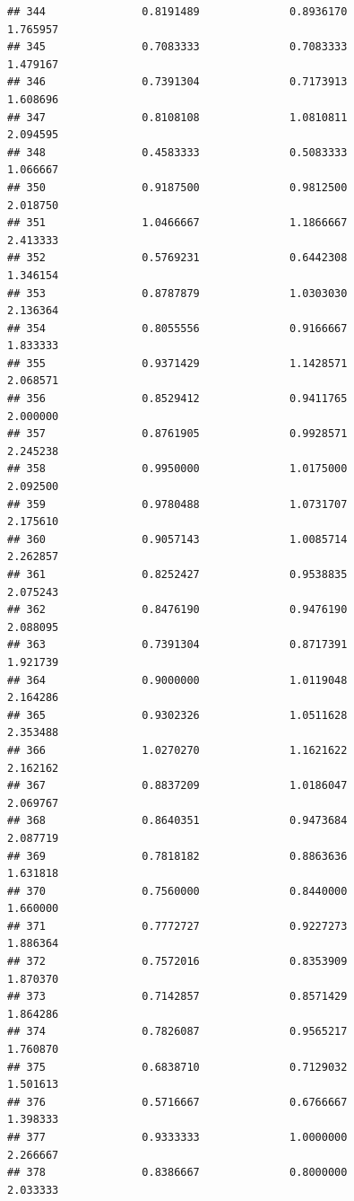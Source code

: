\documentclass[]{article}
\begin{document}
\begin{verbatim}
## 344               0.8191489              0.8936170               1.765957
## 345               0.7083333              0.7083333               1.479167
## 346               0.7391304              0.7173913               1.608696
## 347               0.8108108              1.0810811               2.094595
## 348               0.4583333              0.5083333               1.066667
## 350               0.9187500              0.9812500               2.018750
## 351               1.0466667              1.1866667               2.413333
## 352               0.5769231              0.6442308               1.346154
## 353               0.8787879              1.0303030               2.136364
## 354               0.8055556              0.9166667               1.833333
## 355               0.9371429              1.1428571               2.068571
## 356               0.8529412              0.9411765               2.000000
## 357               0.8761905              0.9928571               2.245238
## 358               0.9950000              1.0175000               2.092500
## 359               0.9780488              1.0731707               2.175610
## 360               0.9057143              1.0085714               2.262857
## 361               0.8252427              0.9538835               2.075243
## 362               0.8476190              0.9476190               2.088095
## 363               0.7391304              0.8717391               1.921739
## 364               0.9000000              1.0119048               2.164286
## 365               0.9302326              1.0511628               2.353488
## 366               1.0270270              1.1621622               2.162162
## 367               0.8837209              1.0186047               2.069767
## 368               0.8640351              0.9473684               2.087719
## 369               0.7818182              0.8863636               1.631818
## 370               0.7560000              0.8440000               1.660000
## 371               0.7772727              0.9227273               1.886364
## 372               0.7572016              0.8353909               1.870370
## 373               0.7142857              0.8571429               1.864286
## 374               0.7826087              0.9565217               1.760870
## 375               0.6838710              0.7129032               1.501613
## 376               0.5716667              0.6766667               1.398333
## 377               0.9333333              1.0000000               2.266667
## 378               0.8386667              0.8000000               2.033333

\end{verbatim}
\end{document}
